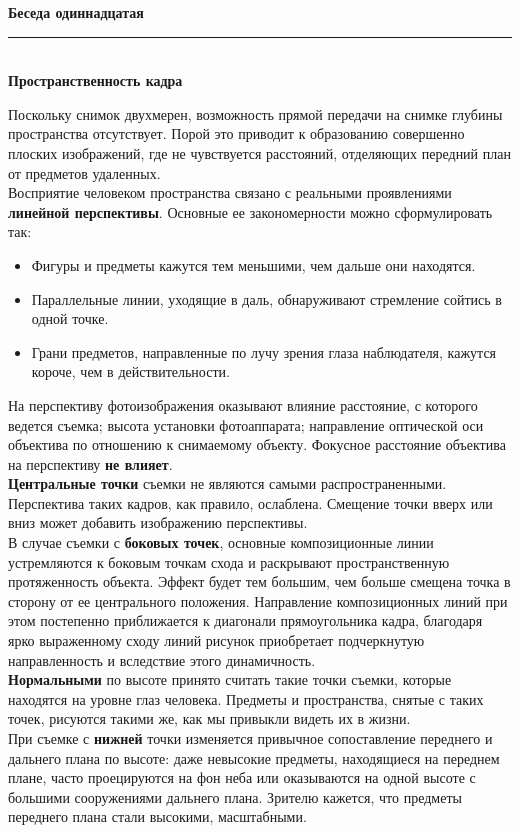 \documentclass{article}
\renewcommand{\section}[2]{
	\vspace{2em}
	\begin{flushright}
		\Large
		\baselineskip=0.5\baselineskip
		\textbf{#1}
		\\
		\rule[0.5\baselineskip]{\textwidth}{0.15pt}
		\\
		\textbf{#2}
	\end{flushright}
}
\newcommand{\important}[1]{\textbf{#1}}
\begin{document}
\section{Беседа одиннадцатая}{Пространственность кадра}
Поскольку снимок двухмерен, возможность прямой передачи на снимке глубины пространства отсутствует. Порой это приводит к образованию совершенно плоских изображений, где не чувствуется расстояний, отделяющих передний план от предметов удаленных.\\
Восприятие человеком пространства связано с реальными проявлениями \important{линейной перспективы}. Основные ее закономерности можно сформулировать так:
\begin{itemize}
	\item Фигуры и предметы кажутся тем меньшими, чем дальше они находятся.
	\item Параллельные линии, уходящие в даль, обнаруживают стремление сойтись в одной точке.
	\item Грани предметов, направленные по лучу зрения глаза наблюдателя, кажутся короче, чем в действительности.
\end{itemize}
На перспективу фотоизображения оказывают влияние расстояние, с которого ведется съемка; высота установки фотоаппарата; направление оптической оси объектива по отношению к снимаемому объекту. Фокусное расстояние объектива на перспективу \important{не влияет}.\\
\important{Центральные точки} съемки не являются самыми распространенными. Перспектива таких кадров, как правило, ослаблена. Смещение точки вверх или вниз может добавить изображению перспективы.\\
В случае съемки с \important{боковых точек}, основные композиционные линии устремляются к боковым точкам схода и раскрывают пространственную протяженность объекта. Эффект будет тем большим, чем больше смещена точка в сторону от ее центрального положения. Направление композиционных линий при этом постепенно приближается к диагонали прямоугольника кадра, благодаря ярко выраженному сходу линий рисунок приобретает подчеркнутую направленность и вследствие этого динамичность.\\
\important{Нормальными} по высоте принято считать такие точки съемки, которые находятся на уровне глаз человека. Предметы и пространства, снятые с таких точек, рисуются такими же, как мы привыкли видеть их в жизни.\\
При съемке с \important{нижней} точки изменяется привычное сопоставление переднего и дальнего плана по высоте: даже невысокие предметы, находящиеся на переднем плане, часто проецируются на фон неба или оказываются на одной высоте с большими сооружениями дальнего плана. Зрителю кажется, что предметы переднего плана стали высокими, масштабными.\\
\end{document}
